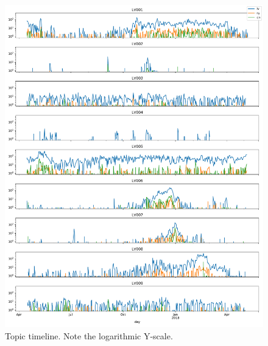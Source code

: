 \begin{figure}
  \centering
  \includegraphics[width=\textwidth]{supplement/topic_timeline.pdf}
  \caption{Topic timeline. Note the logarithmic Y-scale.}
  \label{fig:topic_timeline}
\end{figure}